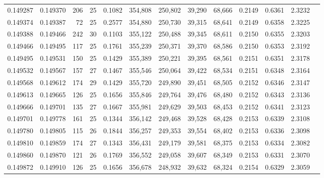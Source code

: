 \begin{tabular}{rrrrrrrrrrrrr}
0.149287 & 0.149370 & 206 &  25 &                                     0.1082 & 354,808 & 250,802 &  39,290 &  68,666 & 0.2149 & 0.6361 & 2.3232 \\
0.149374 & 0.149387 &  72 &  25 &                                     0.2577 & 354,880 & 250,730 &  39,315 &  68,641 & 0.2149 & 0.6358 & 2.3225 \\
0.149388 & 0.149466 & 242 &  30 &                                     0.1103 & 355,122 & 250,488 &  39,345 &  68,611 & 0.2150 & 0.6355 & 2.3203 \\
0.149466 & 0.149495 & 117 &  25 &                                     0.1761 & 355,239 & 250,371 &  39,370 &  68,586 & 0.2150 & 0.6353 & 2.3192 \\
0.149495 & 0.149531 & 150 &  25 &                                     0.1429 & 355,389 & 250,221 &  39,395 &  68,561 & 0.2151 & 0.6351 & 2.3178 \\
0.149532 & 0.149567 & 157 &  27 &                                     0.1467 & 355,546 & 250,064 &  39,422 &  68,534 & 0.2151 & 0.6348 & 2.3164 \\
0.149568 & 0.149612 & 174 &  29 &                                     0.1429 & 355,720 & 249,890 &  39,451 &  68,505 & 0.2152 & 0.6346 & 2.3147 \\
0.149613 & 0.149665 & 126 &  25 &                                     0.1656 & 355,846 & 249,764 &  39,476 &  68,480 & 0.2152 & 0.6343 & 2.3136 \\
0.149666 & 0.149701 & 135 &  27 &                                     0.1667 & 355,981 & 249,629 &  39,503 &  68,453 & 0.2152 & 0.6341 & 2.3123 \\
0.149701 & 0.149778 & 161 &  25 &                                     0.1344 & 356,142 & 249,468 &  39,528 &  68,428 & 0.2153 & 0.6339 & 2.3108 \\
0.149780 & 0.149805 & 115 &  26 &                                     0.1844 & 356,257 & 249,353 &  39,554 &  68,402 & 0.2153 & 0.6336 & 2.3098 \\
0.149810 & 0.149859 & 174 &  27 &                                     0.1343 & 356,431 & 249,179 &  39,581 &  68,375 & 0.2153 & 0.6334 & 2.3082 \\
0.149860 & 0.149870 & 121 &  26 &                                     0.1769 & 356,552 & 249,058 &  39,607 &  68,349 & 0.2153 & 0.6331 & 2.3070 \\
0.149872 & 0.149910 & 126 &  25 &                                     0.1656 & 356,678 & 248,932 &  39,632 &  68,324 & 0.2154 & 0.6329 & 2.3059 \\

\end{tabular}
